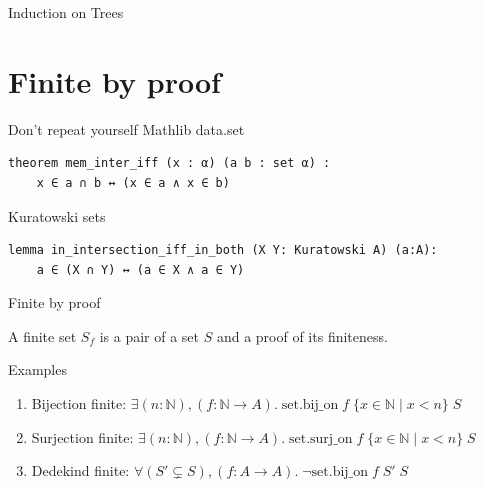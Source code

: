 \documentclass[aspectratio=169]{beamer}
\begin{document}
    \begin{frame}[fragile]{Induction on Trees}
        \centering
    \end{frame}
    
\section{Finite by proof}
    \begin{frame}[fragile]{Don't repeat yourself}
        Mathlib data.set
        \begin{lstlisting}
theorem mem_inter_iff (x : α) (a b : set α) :
    x ∈ a ∩ b ↔ (x ∈ a ∧ x ∈ b)
        \end{lstlisting}
        Kuratowski sets
        \begin{lstlisting}
lemma in_intersection_iff_in_both (X Y: Kuratowski A) (a:A): 
    a ∈ (X ∩ Y) ↔ (a ∈ X ∧ a ∈ Y)
        \end{lstlisting}

    \end{frame}
    \begin{frame}{Finite by proof}
        \begin{definition}
            A finite set $S_f$ is a pair of a set $S$ and a proof of its finiteness.
        \end{definition}
        \pause
        Examples
        \begin{enumerate}
            \item Bijection finite: $\exists (n:\mathbb{N}), (f: \mathbb{N} \to A).\; \text{{set.bij\_on}}\; f \;\{ x \in \mathbb{N} \mid x < n\} \;S$
            \item Surjection finite: $\exists (n:\mathbb{N}), (f: \mathbb{N} \to A).\; \text{{set.surj\_on}}\; f \;\{ x \in \mathbb{N} \mid x < n\} \;S $
            \item Dedekind finite: $\forall (S' \subsetneq S), (f: A \to A).\; \neg \text{{set.bij\_on}}\; f\; S'\; S$
        \end{enumerate}
    \end{frame}
    
\end{document}
